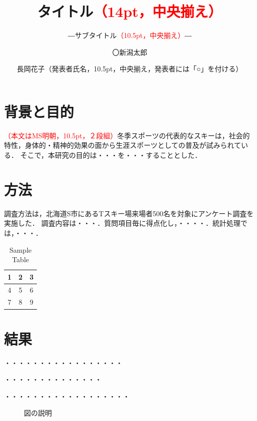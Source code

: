 \documentclass{css2025}
\title{
	タイトル\textcolor{red}{（14pt，中央揃え）}
}
\subtitle{
    ―サブタイトル\textcolor{red}{（10.5pt，中央揃え）}―
}
\author[1]{〇新潟太郎}
\author[2]{長岡花子（発表者氏名，10.5pt，中央揃え，発表者には「○」を付ける）}
\affil[1)]{冬季大学\textcolor{red}{（発表者の所属）}}
\affil[2)]{スポーツ大学\textcolor{red}{（発表者の所属）}}
\begin{document}
\maketitle

\section{背景と目的}
\textcolor{red}{（本文はMS明朝，10.5pt，２段組）}冬季スポーツの代表的なスキーは，社会的特性，身体的・精神的効果の面から生涯スポーツとしての普及が試みられている．
そこで，本研究の目的は・・・を・・・することとした．

\section{方法}
調査方法は，北海道S市にあるTスキー場来場者500名を対象にアンケート調査を実施した．
調査内容は・・・．質問項目毎に得点化し，・・・・．統計処理では，・・・．

\begin{table}[h]
    \centering
    \caption{Sample Table}
    \begin{tabular}{|c|c|c|}
        \hline
        1 & 2 & 3 \\
        \hline
        4 & 5 & 6 \\
        \hline
        7 & 8 & 9 \\
        \hline
    \end{tabular}
    \label{tab:sample}
\end{table}

\section{結果}
・・・・・・・・・・・・・・・・・

・・・・・・・・・・・・・・

・・・・・・・・・・・・・・・・・・

\begin{figure}[htbp]
    \centering
    \caption{図の説明 \cite{cite:niigata2024} \cite{cite:青空文庫Aozo22:online}}
    \label{fig:fig1}
\end{figure}



\end{document}
